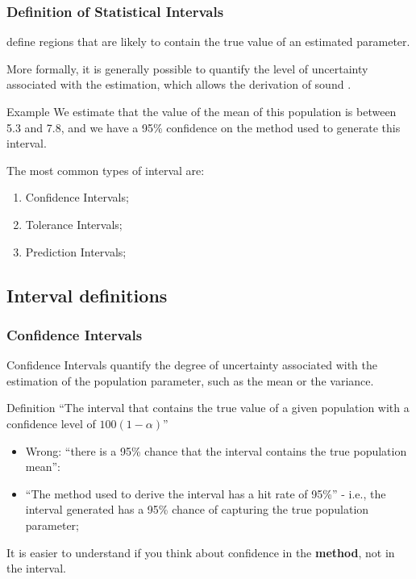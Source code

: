 \documentclass[10pt]{beamer}
\begin{document}
\begin{frame}
  \frametitle{Definition of Statistical Intervals}
   define regions that are likely to
  contain the true value of an estimated parameter.
 
  \medskip
  
  More formally, it is generally possible to quantify the level of
  uncertainty associated with the estimation, which allows the
  derivation of sound .

  \begin{exampleblock}{Example}
    We estimate that the value of the mean of this population is
    between 5.3 and 7.8, and we have a 95\% confidence on the method
    used to generate this interval.
  \end{exampleblock}

  The most common types of interval are:
  \begin{enumerate}
  \item Confidence Intervals;
  \item Tolerance Intervals;
  \item Prediction Intervals;
  \end{enumerate}
\end{frame}

\subsection{Interval definitions}
\begin{frame}
  \frametitle{Confidence Intervals} 

  Confidence Intervals quantify the degree of uncertainty associated
  with the estimation of the population parameter, such as the mean or
  the variance.

  \begin{block}{Definition}
    ``The interval that contains the true value of a given population
    with a confidence level of $100(1-\alpha)$''
  \end{block}
  
  \bigskip
  
  \begin{itemize}
    \item \alert{Wrong:} ``there is a 95\% chance that the interval
      contains the true population mean'':
    \item {} ``The method used to derive the interval
      has a hit rate of 95\%'' - i.e., the interval generated has a
      95\% chance of capturing the true population parameter;
  \end{itemize}

  \medskip

  It is easier to understand if you think about confidence in the {\bf
    method}, not in the interval.
\end{frame}
\end{document}

